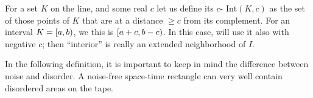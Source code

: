 \documentclass[11pt]{memoir}
\theoremstyle{definition} %
\renewcommand{\ge}{\geq}
\newcommand{\Int}{\mathrm{Int}} %
\begin{document}

 \begin{definition}\label{def:interior}
  For a set \( K \) on the line,  and some real \( c \) let us define its \( c \)-
  \(  \Int(K,c) \) as the set of those points of \( K \) that are at a distance \( \ge c \) from
  its complement.
  For an interval \( K = \left[a,b\right) \), we this is \( \left[a+c,b-c\right) \).
  In this case, will use it also  with negative \( c \); then ``interior'' is really an extended
  neighborhood of \( I \).
 \end{definition}

  In the following definition, it is important to keep in mind the difference between noise and disorder.
  A noise-free space-time rectangle can very well contain disordered areas on the tape.
  
\end{document}
